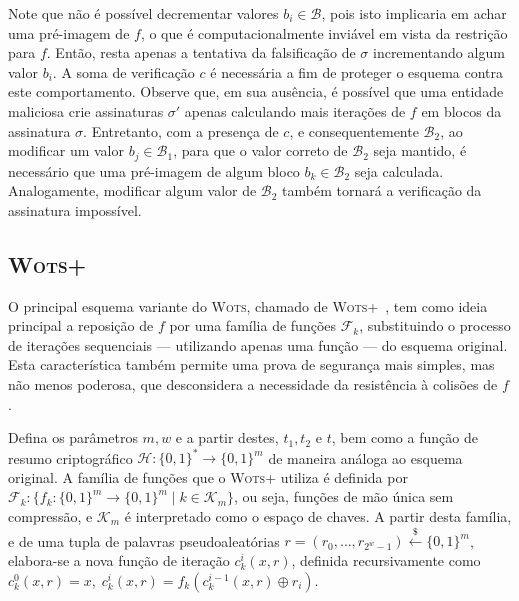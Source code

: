 \documentclass[12pt]{report}
\newcommand{\binwds}[1]{\{0, 1\}^{#1}}
\begin{document}
Note que não é possível decrementar valores $b_i \in \mathcal{B}$, pois isto implicaria em achar uma pré-imagem de $f$, o que é computacionalmente inviável em vista da restrição para $f$. Então, resta apenas a tentativa da falsificação de $\sigma$ incrementando algum valor $b_i$. A soma de verificação $c$ é necessária a fim de proteger o esquema contra este comportamento. Observe que, em sua ausência, é possível que uma entidade maliciosa crie assinaturas $\sigma'$ apenas calculando mais iterações de $f$ em blocos da assinatura $\sigma$. Entretanto, com a presença de $c$, e consequentemente $\mathcal{B}_2$, ao modificar um valor $b_j \in \mathcal{B}_1$, para que o valor correto de $\mathcal{B}_2$ seja mantido, é necessário que uma pré-imagem de algum bloco $b_k \in \mathcal{B}_2$ seja calculada. Analogamente, modificar algum valor de $\mathcal{B}_2$ também tornará a verificação da assinatura impossível.

\subsection{\textsc{Wots+}}

O principal esquema variante do \textsc{Wots}, chamado de \textsc{Wots+}~\cite{cryptoeprint:2017:965}, tem como ideia principal a reposição de $f$ por uma família de funções $\mathcal{F}_k$, substituindo o processo de iterações sequenciais --- utilizando apenas uma função --- do esquema original. Esta característica também permite uma prova de segurança mais simples, mas não menos poderosa, que desconsidera a necessidade da resistência à colisões de $f$.

Defina os parâmetros $m, w$ e a partir destes, $t_1, t_2 \text{ e } t$, bem como a função de resumo criptográfico $\mathcal{H} : \binwds{*} \longrightarrow \binwds{m}$ de maneira análoga ao esquema original. A família de funções que o \textsc{Wots+} utiliza é definida por $\mathcal{F}_k : \{f_k : \binwds{m} \longrightarrow \binwds{m} \mid k \in \mathcal{K}_m\}$, ou seja, funções de mão única sem compressão, e $\mathcal{K}_m$ é interpretado como o espaço de chaves. A partir desta família, e de uma tupla de palavras pseudoaleatórias $r = (r_0, \dots, r_{2^w - 1}) \stackrel{\$}{\longleftarrow} \binwds{m}$, elabora-se a nova função de iteração $c^{i}_{k}(x, r)$, definida recursivamente como $c^{0}_{k}(x, r) = x, \; c^{i}_{k}(x, r) = f_k(c^{i-1}_{k}(x, r) \oplus r_i)$.
\end{document}
